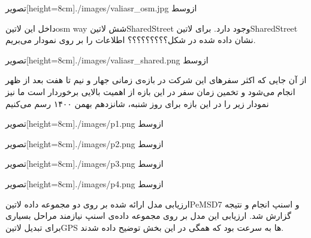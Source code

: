   ‌تصویر[height=8cm]{./images/valiasr_osm.jpg}
  ‌ازوسط

 داخل این ‌لاتین{osm way} شش ‌لاتین{SharedStreet} وجود دارد. برای ‌لاتین{SharedStreet} نشان داده شده در شکل؟؟؟؟؟؟؟؟؟ اطلاعات را بر روی نمودار می‌بریم.

  ‌تصویر[height=8cm]{./images/valiasr_shared.png}
  ‌ازوسط

از آن جایی که اکثر سفرهای این شرکت در بازه‌ی زمانی جهار و نیم تا هفت بعد از ظهر انجام می‌شود و تخمین زمان سفر در این بازه از اهمیت بالایی برخوردار است ما نیز نمودار زیر را در این بازه برای روز شنبه، شانزدهم بهمن ۱۴۰۰ رسم می‌کنیم


  ‌تصویر[height=8cm]{./images/p1.png}
  ‌ازوسط


  ‌تصویر[height=8cm]{./images/p2.png}
  ‌ازوسط


  ‌تصویر[height=8cm]{./images/p3.png}
  ‌ازوسط


  ‌تصویر[height=8cm]{./images/p4.png}
  ‌ازوسط




ارزیابی مدل ارائه شده بر روی دو مجموعه داده ‌لاتین{PeMSD7} و اسنپ انجام و نتیجه گزارش شد. ارزیابی این مدل بر روی مجموعه داده‌ی اسنپ نیازمند مراحل بسیاری برای تبدیل ‌لاتین{GPS} ها به سرعت بود که همگی در این بخش توضیح داده شدند.

